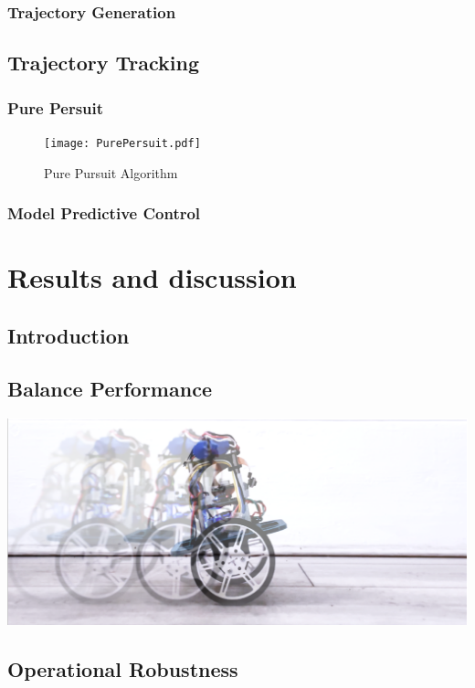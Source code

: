             \subsubsection{Trajectory Generation}

    \subsection{Trajectory Tracking}
        \subsubsection{Pure Persuit}
        \begin{figure}
            \texttt{[image: PurePersuit.pdf]}
            \caption{Pure Pursuit Algorithm}
        \end{figure}
        \subsubsection{Model Predictive Control}


  \section{Results and discussion} %
    \subsection{Introduction}
    \subsection{Balance Performance}
    \includegraphics[width=\textwidth]{V1Colated.png}
    \subsection{Operational Robustness}
